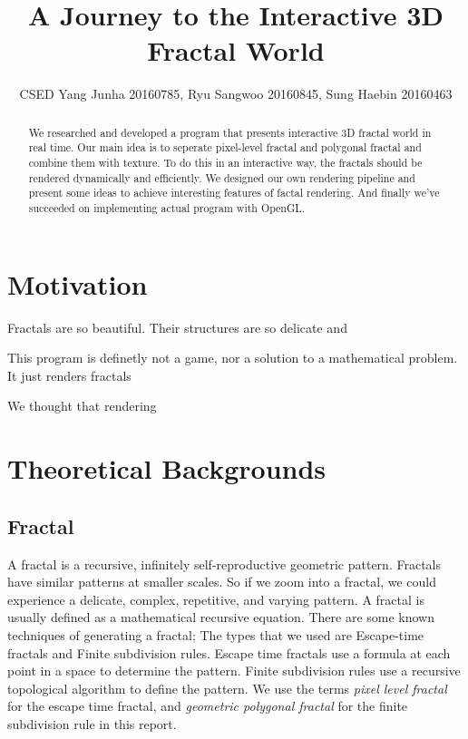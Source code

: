 \documentclass[a4paper]{article}
\title{A Journey to the Interactive 3D Fractal World}
\author{CSED Yang Junha 20160785, Ryu Sangwoo 20160845, Sung Haebin 20160463}
\begin{document}
\maketitle
\begin{abstract}
We researched and developed a program that presents interactive 3D fractal world in real time.
Our main idea is to seperate pixel-level fractal and polygonal fractal and combine them with texture.
To do this in an interactive way, the fractals should be rendered dynamically and efficiently.
We designed our own rendering pipeline and present some ideas to achieve interesting features of factal rendering.
And finally we've succeeded on implementing actual program with OpenGL.
\end{abstract}
\section{Motivation}
Fractals are so beautiful.
Their structures are so delicate and

This program is definetly not a game, nor a solution to a mathematical problem.
It just renders fractals

We thought that rendering 


\section{Theoretical Backgrounds}
\subsection{Fractal}
A fractal is a recursive, infinitely self-reproductive geometric pattern. 
Fractals have similar patterns at smaller scales. 
So if we zoom into a fractal, we could experience a delicate, complex, repetitive, and varying pattern. 
A fractal is usually defined as a mathematical recursive equation. 
There are some known techniques of generating a fractal; 
The types that we used are Escape-time fractals and Finite subdivision rules. 
Escape time fractals use a formula at each point in a space to determine the pattern. 
Finite subdivision rules use a recursive topological algorithm to define the pattern. 
We use the terms \textit{pixel level fractal} for the escape time fractal, and \textit{geometric polygonal fractal} for the finite subdivision rule in this report. 
\end{document}
